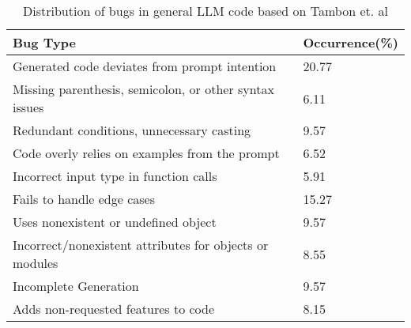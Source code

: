 \begin{table}[h!]
\centering
     \caption{Distribution of bugs in general LLM code based on Tambon et. al\cite{tambon2024bugs}}
    \label{tab:general_bug}
   
\begin{tabular}{ll}
Bug Type                      & Occurrence(\%) \\ \hline
Generated code deviates from prompt intention             & 20.77          \\
Missing parenthesis, semicolon, or other syntax issues                   & 6.11           \\
Redundant conditions, unnecessary casting                 & 9.57           \\
Code overly relies on examples from the prompt           & 6.52           \\
Incorrect input type in function calls & 5.91           \\
Fails to handle edge cases          & 15.27          \\
Uses nonexistent or undefined object          & 9.57           \\
Incorrect/nonexistent attributes for objects or modules               & 8.55           \\
Incomplete Generation         & 9.57           \\
Adds non-requested features to code   & 8.15          
\end{tabular}
\end{table}